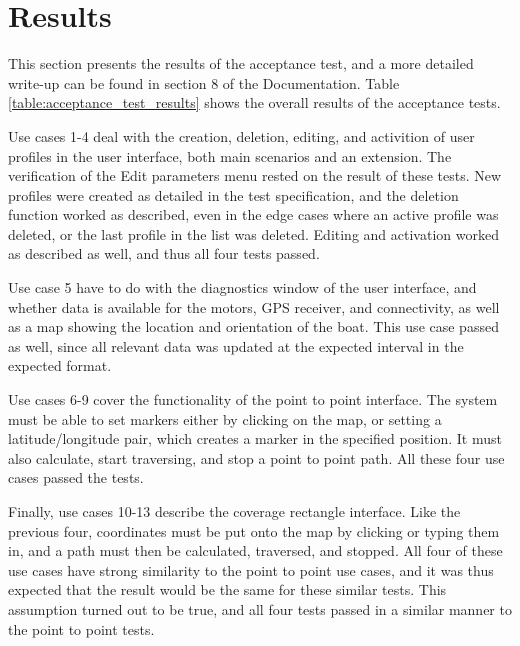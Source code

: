 \newpage
\chapter{Results}
This section presents the results of the acceptance test, and a more detailed write-up can be found in section 8 of the Documentation. Table \ref{table:acceptance_test_results} shows the overall results of the acceptance tests.

Use cases 1-4 deal with the creation, deletion, editing, and activition of user profiles in the user interface, both main scenarios and an extension. The verification of the Edit parameters menu rested on the result of these tests. New profiles were created as detailed in the test specification, and the deletion function worked as described, even in the edge cases where an active profile was deleted, or the last profile in the list was deleted. Editing and activation worked as described as well, and thus all four tests passed. 

Use case 5 have to do with the diagnostics window of the user interface, and whether data is available for the motors, GPS receiver, and connectivity, as well as a map showing the location and orientation of the boat. This use case passed as well, since all relevant data was updated at the expected interval in the expected format.

Use cases 6-9 cover the functionality of the point to point interface. The system must be able to set markers either by clicking on the map, or setting a latitude/longitude pair, which creates a marker in the specified position. It must also calculate, start traversing, and stop a point to point path. All these four use cases passed the tests.

Finally, use cases 10-13 describe the coverage rectangle interface. Like the previous four, coordinates must be put onto the map by clicking or typing them in, and a path must then be calculated, traversed, and stopped. All four of these use cases have strong similarity to the point to point use cases, and it was thus expected that the result would be the same for these similar tests. This assumption turned out to be true, and all four tests passed in a similar manner to the point to point tests.

